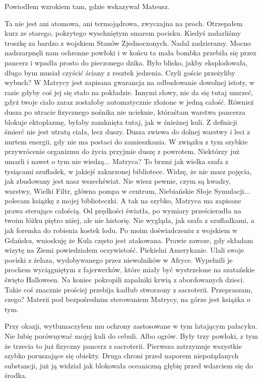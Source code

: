 Powiodłem wzrokiem tam, gdzie wskazywał Mateusz.
\begin{dialogue}
\ds{} Ta nie jest ani atomowa, ani termojądrowa, zwyczajna na proch. \dm{} Otrzepałem kurz ze starego, pokrytego wyschniętym smarem pocisku. \dm{} 
Kiedyś zadarliśmy troszkę za bardzo z wojskiem Stanów Zjednoczonych. Nadal zadzieramy.
Mocno nadszarpnęli nam ochronne powłoki i w końcu ta mała bombka przebiła się przez pancerz i wpadła prosto do pieczonego dzika.
Było blisko, jakby eksplodowała, długo bym musiał czyścić ściany z resztek jedzenia.
\ds{} Czyli goście przeżyliby wybuch?
\ds{} W Matrycy jest zapisana gwarancja na odbudowanie dowolnej istoty, w razie gdyby coś jej się stało na pokładzie. 
Innymi słowy, nie da się tutaj umrzeć, gdyż twoje ciało zaraz zostałoby automatycznie złożone w jedną całość.
Również dusza po utracie fizycznego nośnika nie ucieknie, któraśtam warstwa pancerza blokuje ektoplazmę, byłaby zamknięta tutaj, jak w śnieżnej kuli.
Z definicji śmierć nie jest utratą ciała, lecz duszy. Dusza zwiewa do dolnej warstwy i leci z nurtem energii, gdy nie ma postaci do zamieszkania. 
W związku z tym szybkie przywrócenie organizmu do życia przyjmie duszę z powrotem.
Niektórzy już umarli i nawet o tym nie wiedzą...
\ds{} Matryca? To brzmi jak wielka szafa z tysiącami szufladek, w jakiejś zakurzonej bibliotece.
\ds{} Widzę, że nie masz pojęcia, jak zbudowany jest nasz wszechświat. Nie wiesz pewnie, czym są kwadry, warstwy, Wielki Filtr, główna pompa w centrum, 
Niebiańskie Słoje Symulacji... polecam książkę z mojej biblioteczki.
A tak na szybko, Matryca ma zapisane prawa sterujące całością. Od prędkości światła, po wymiary prześcieradła na twoim łóżku piętro niżej, ale nie historię.
Nie wygląda, jak szafa z szufladkami, a jak foremka do robienia kostek lodu.
\ds{} Po moim doświadczeniu z wojskiem w Gdańsku, wnioskuję że Kula często jest atakowana.
\ds{} Prawie zawsze, gdy składam wizytę na Ziemi \dm{} powiedziałem oczywistość. \dm{} Piekielni Amerykanie. 
Ulali swoje pociski z żelaza, wydobywanego przez niewolników w Afryce.
Wypełnili je prochem wyciągniętym z fajerwerków, które miały być wystrzelone na szatańskie święto Halloween. 
Na koniec pokropili zapalniki krwią z abordowanych dzieci.
Takie coś znacznie prościej przebija kadłub stworzony z sacroterii.
\ds{} Przepraszam, czego?
\ds{} Materii pod bezpośrednim sterowaniem Matrycy, na górze jest książka o tym.
\end{dialogue}

Przy okazji, wytłumaczyłem mu ochrony zastosowane w tym latającym pałacyku. 
Nie lubię porównywać mojej kuli do cebuli. Albo ogrów.
Były trzy powłoki, z tym że trzecia to już fizyczny pancerz z sacroterii.
Pierwsza zatrzymuje wszystkie szybko poruszające się obiekty.
Druga chroni przed naporem niepożądanych substancji, już ją widział jak blokowała oceaniczną głębię przed wdarciem się do środka.


